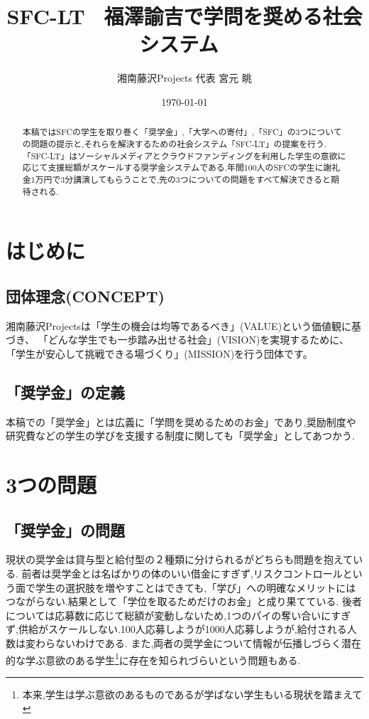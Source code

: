 \documentclass[uplatex, a4j]{jsarticle}
\date{\today}
\title{SFC-LT ~福澤諭吉で学問を奨める社会システム~}
\author{湘南藤沢Projects 代表 宮元 眺}
\begin{document}


\maketitle
\begin{abstract}
  本稿ではSFCの学生を取り巻く「奨学金」,「大学への寄付」,「SFC」の3つについての問題の提示と,それらを解決するための社会システム「SFC-LT」の提案を行う.「SFC-LT」はソーシャルメディアとクラウドファンディングを利用した学生の意欲に応じて支援総額がスケールする奨学金システムである.年間100人のSFCの学生に謝礼金1万円で3分講演してもらうことで,先の3つについての問題をすべて解決できると期待される.

\end{abstract}

\section{はじめに}
\subsection{団体理念(CONCEPT)}

  湘南藤沢Projectsは「学生の機会は均等であるべき」(VALUE)という価値観に基づき、
  「どんな学生でも一歩踏み出せる社会」(VISION)を実現するために、
  「学生が安心して挑戦できる場づくり」(MISSION)を行う団体です。

\subsection{「奨学金」の定義}
  本稿での「奨学金」とは広義に「学問を奨めるためのお金」であり,奨励制度や研究費などの学生の学びを支援する制度に関しても「奨学金」としてあつかう.



\section{3つの問題}

\subsection{「奨学金」の問題}
  現状の奨学金は貸与型と給付型の２種類に分けられるがどちらも問題を抱えている.
  前者は奨学金とは名ばかりの体のいい借金にすぎず,リスクコントロールという面で学生の選択肢を増やすことはできても,「学び」への明確なメリットにはつながらない.結果として「学位を取るためだけのお金」と成り果てている.
  後者については応募数に応じて総額が変動しないため,1つのパイの奪い合いにすぎず,供給がスケールしない.100人応募しようが1000人応募しようが,給付される人数は変わらないわけである.
  また,両者の奨学金について情報が伝播しづらく潜在的な学ぶ意欲のある学生\footnote{本来,学生は学ぶ意欲のあるものであるが学ばない学生もいる現状を踏まえて}に存在を知られづらいという問題もある.
\end{document}
